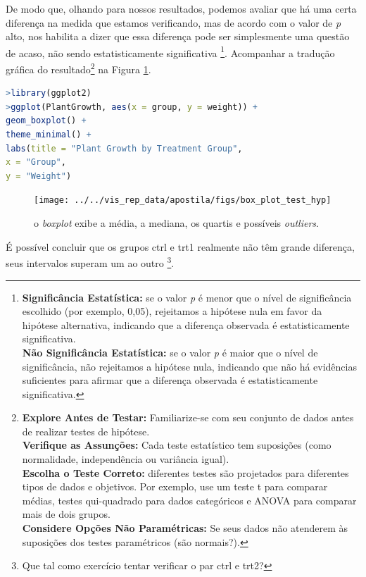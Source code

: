 \documentclass[article]{memoir}
\begin{document}
De modo que, olhando para nossos resultados, podemos avaliar que há uma certa diferença na medida que estamos verificando, mas de acordo com o valor de \textit{p} alto, nos habilita a dizer que essa diferença pode ser simplesmente uma questão de acaso, não sendo estatisticamente significativa \footnote{\textbf{Significância Estatística:} se o valor \textit{p} é menor que o nível de significância escolhido (por exemplo, 0,05), rejeitamos a hipótese nula em favor da hipótese alternativa, indicando que a diferença observada é estatisticamente significativa.\\
	
	\textbf{Não Significância Estatística:} se o valor \textit{p} é maior que o nível de significância, não rejeitamos a hipótese nula, indicando que não há evidências suficientes para afirmar que a diferença observada é estatisticamente significativa.}. Acompanhar a tradução gráfica do resultado\footnote{\textbf{Explore Antes de Testar:} Familiarize-se com seu conjunto de dados antes de realizar testes de hipótese. \\
	\textbf{Verifique as Assunções:} Cada teste estatístico tem suposições (como normalidade, independência ou variância igual). \\ 
	\textbf{Escolha o Teste Correto:} diferentes testes são projetados para diferentes tipos de dados e objetivos. Por exemplo, use um teste t para comparar médias, testes qui-quadrado para dados categóricos e ANOVA para comparar mais de dois grupos.\\
	\textbf{Considere Opções Não Paramétricas:} Se seus dados não atenderem às suposições dos testes paramétricos (são normais?).} na Figura \ref{fig:boxplottesthyp}.

\begin{lstlisting}[language={R}, caption={apresentação dos resultados.}, label={lst:result}]
>library(ggplot2)
>ggplot(PlantGrowth, aes(x = group, y = weight)) +
geom_boxplot() +
theme_minimal() +
labs(title = "Plant Growth by Treatment Group",
x = "Group",
y = "Weight")
\end{lstlisting}


\begin{figure}[ht]
	\centering
	\texttt{[image: ../../vis\_rep\_data/apostila/figs/box\_plot\_test\_hyp]}
	\caption{o \textit{boxplot} exibe a média, a mediana, os quartis e possíveis \textit{outliers}.}
	\label{fig:boxplottesthyp}
\end{figure}

É possível concluir que  os grupos ctrl e trt1 realmente não têm grande diferença, seus intervalos superam um ao outro \footnote{Que tal como exercício tentar verificar o par ctrl e trt2?}. 
\end{document}
